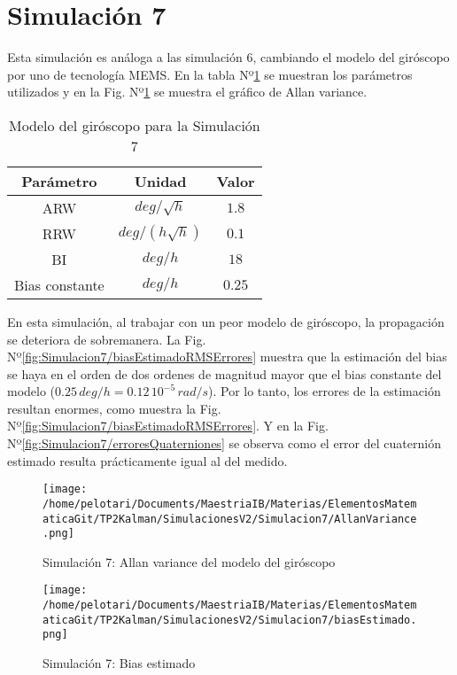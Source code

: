 \documentclass[a4paper,11pt,twoside]{IT-CNEA}
\begin{document}
\section{Simulación 7}
Esta simulación es análoga a las simulación 6, cambiando el modelo del giróscopo por uno de tecnología MEMS. En la tabla Nº\ref{tabla:modeloGyroRLGSimulacion7} se muestran los parámetros utilizados y en la Fig. Nº\ref{fig:Simulacion7/AllanVariance} se muestra el gráfico de Allan variance.
\begin{table}[h!]
\centering
\caption{Modelo del giróscopo para la Simulación 7}
\label{tabla:modeloGyroRLGSimulacion7}
\begin{tabular}{|c|c|c|}
\hline
Parámetro & Unidad& Valor\\ \hline
ARW&$deg/\sqrt{h}$&$1.8$ \\ \hline
RRW&$deg/\left(h\sqrt{h}\right)$&$0.1$ \\ \hline
BI&$deg/h$&$18$ \\ \hline
Bias constante&$deg/h$&$0.25$ \\ \hline
\end{tabular}
\end{table}
\par En esta simulación, al trabajar con un peor modelo de giróscopo, la propagación se deteriora de sobremanera. La Fig. Nº\ref{fig:Simulacion7/biasEstimadoRMSErrores} muestra que la estimación del bias se haya en el orden de dos ordenes de magnitud mayor que el bias constante del modelo ($0.25\,deg/h=0.12\,10^{-5}\,rad/s$). Por lo tanto, los errores de la estimación resultan enormes, como muestra la Fig. Nº\ref{fig:Simulacion7/biasEstimadoRMSErrores}. Y en la Fig. Nº\ref{fig:Simulacion7/erroresQuaterniones} se observa como el error del cuaternión estimado resulta prácticamente igual al del medido.
\begin{figure}[h!]
\centering
\texttt{[image: /home/pelotari/Documents/MaestriaIB/Materias/ElementosMatematicaGit/TP2Kalman/SimulacionesV2/Simulacion7/AllanVariance.png]}
\caption{Simulación 7:  Allan variance del modelo del giróscopo}
\label{fig:Simulacion7/AllanVariance}
\end{figure}
\begin{figure}[h!]
\centering
\texttt{[image: /home/pelotari/Documents/MaestriaIB/Materias/ElementosMatematicaGit/TP2Kalman/SimulacionesV2/Simulacion7/biasEstimado.png]}
\caption{Simulación 7:  Bias estimado}
\label{fig:Simulacion7/biasEstimado}
\end{figure}
\end{document}
